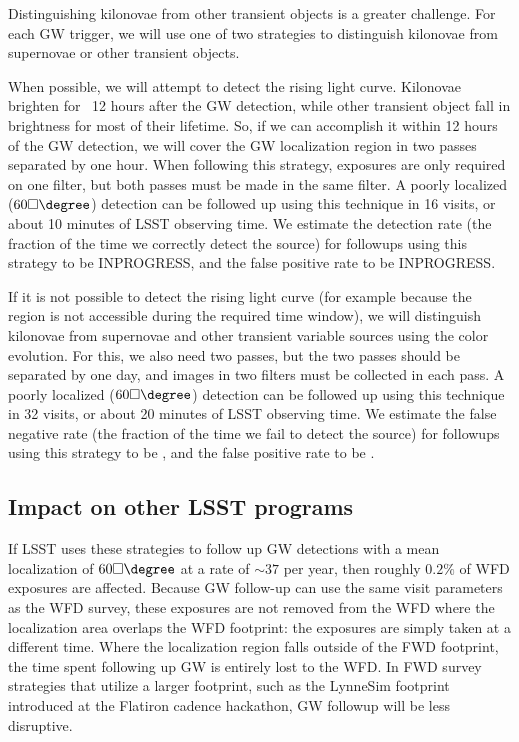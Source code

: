 Distinguishing kilonovae from other transient objects is a greater challenge. For each GW trigger, we will use one of two strategies to distinguish kilonovae from supernovae or other transient objects.

When possible, we will attempt to detect the rising light curve. Kilonovae brighten for ~12 hours after the GW detection, while other transient object fall in brightness for most of their lifetime. So, if we can accomplish it within 12 hours of the GW detection, we will cover the GW localization region in two passes separated by one hour. When following this strategy, exposures are only required on one filter, but both passes must be made in the same filter. A poorly localized ($60 \square\degree$) detection can be followed up using this technique in 16 visits, or about 10 minutes of LSST observing time. We estimate the detection rate (the fraction of the time we correctly detect the source) for followups using this strategy to be INPROGRESS, and the false positive rate to be INPROGRESS.

If it is not possible to detect the rising light curve (for example because the region is not accessible during the required time window), we will distinguish kilonovae from supernovae and other transient variable sources using the color evolution. For this, we also need two passes, but the two passes should be separated by one day, and images in two filters must be collected in each pass. A poorly localized ($60 \square\degree$) detection can be followed up using this technique in 32 visits, or about 20 minutes of LSST observing time. We estimate the false negative rate (the fraction of the time we fail to detect the source) for followups using this strategy to be \todo{}, and the false positive rate to be \todo{}.


\subsection{Impact on other LSST programs}

If LSST uses these strategies to follow up GW detections with a mean localization of $60\square\degree$ at a rate of $\sim 37$ per year, then roughly $0.2\%$ of WFD exposures are affected. Because GW follow-up can use the same visit parameters as the WFD survey, these exposures are not removed from the WFD where the localization area overlaps the WFD footprint: the exposures are simply taken at a different time. Where the localization region falls outside of the FWD footprint, the time spent following up GW is entirely lost to the WFD. In FWD survey strategies that utilize a larger footprint, such as the LynneSim footprint introduced at the Flatiron cadence hackathon, GW followup will be less disruptive. 

